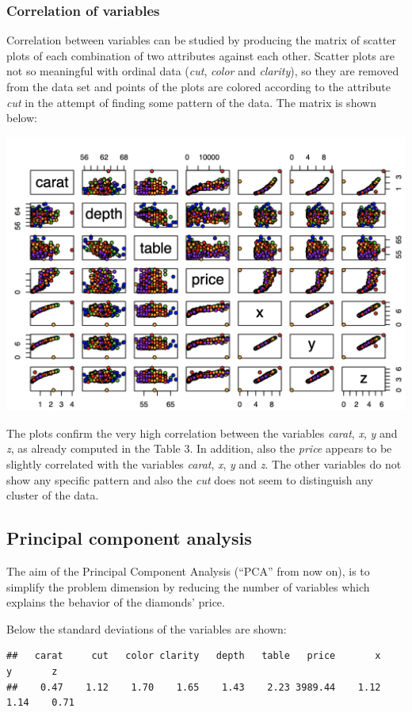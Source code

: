 \documentclass[
]{article}
\begin{document}
\subsubsection{Correlation of variables}\label{correlation-of-variables}

Correlation between variables can be studied by producing the matrix of
scatter plots of each combination of two attributes against each other.
Scatter plots are not so meaningful with ordinal data (\emph{cut},
\emph{color} and \emph{clarity}), so they are removed from the data set
and points of the plots are colored according to the attribute
\emph{cut} in the attempt of finding some pattern of the data. The
matrix is shown below:

\begin{center}\includegraphics[width=0.6\linewidth]{Images/scatterplots} \end{center}

The plots confirm the very high correlation between the variables
\emph{carat}, \emph{x}, \emph{y} and \emph{z}, as already computed in
the Table 3. In addition, also the \emph{price} appears to be slightly
correlated with the variables \emph{carat}, \emph{x}, \emph{y} and
\emph{z}. The other variables do not show any specific pattern and also
the \emph{cut} does not seem to distinguish any cluster of the data.

\subsection{Principal component
analysis}\label{principal-component-analysis}

The aim of the Principal Component Analysis (``PCA'' from now on), is to
simplify the problem dimension by reducing the number of variables which
explains the behavior of the diamonds' price.

Below the standard deviations of the variables are shown:

\begin{verbatim}
##   carat     cut   color clarity   depth   table   price       x       y       z 
##    0.47    1.12    1.70    1.65    1.43    2.23 3989.44    1.12    1.14    0.71
\end{verbatim}
\end{document}
